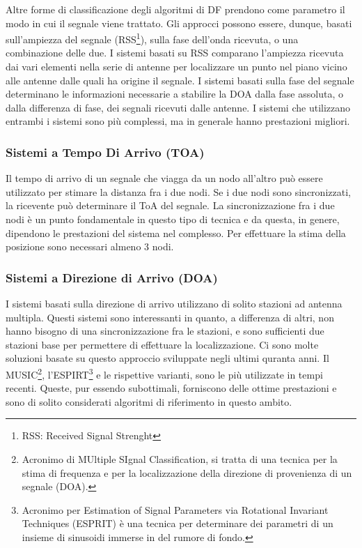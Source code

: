 Altre forme di classificazione degli algoritmi di DF prendono come parametro il modo in cui il segnale viene trattato. Gli approcci possono essere, dunque, basati sull'ampiezza del segnale (RSS\footnote{RSS: Received Signal Strenght}), sulla fase	dell'onda ricevuta, o una combinazione delle due. I sistemi basati su RSS comparano l'ampiezza ricevuta dai vari elementi nella serie di antenne per localizzare un punto nel piano vicino alle antenne dalle quali ha origine il segnale. I sistemi basati sulla fase del segnale determinano le informazioni necessarie a stabilire la DOA dalla fase assoluta, o dalla differenza di fase, dei segnali ricevuti dalle antenne. I sistemi che utilizzano entrambi i sistemi sono più complessi, ma in generale hanno prestazioni migliori.

\subsubsection{Sistemi a Tempo Di Arrivo (TOA)}

Il tempo di arrivo di un segnale che viagga da un nodo all'altro può essere utilizzato per stimare la distanza fra i due nodi. Se i due nodi sono sincronizzati, la ricevente può determinare il ToA del segnale. La sincronizzazione fra i due nodi è un punto fondamentale in questo tipo di tecnica e da questa, in genere, dipendono le prestazioni del sistema nel complesso. Per effettuare la stima della posizione sono necessari almeno 3 nodi.

\subsubsection{Sistemi a Direzione di Arrivo (DOA)}

I sistemi basati sulla direzione di arrivo utilizzano di solito stazioni ad antenna multipla. Questi sistemi sono interessanti in quanto, a differenza di altri, non hanno bisogno di una sincronizzazione fra le stazioni, e sono sufficienti due stazioni base per permettere	di effettuare la localizzazione. Ci sono molte soluzioni basate su questo approccio sviluppate negli ultimi quranta anni. Il MUSIC\footnote{Acronimo di MUltiple SIgnal Classification, si tratta di una tecnica per la stima di frequenza e per la localizzazione della direzione di provenienza di un segnale (DOA).}, l'ESPIRT\footnote{Acronimo per Estimation of Signal Parameters via Rotational Invariant Techniques (ESPRIT) è una tecnica per determinare dei parametri di un insieme di sinusoidi immerse in del rumore di fondo.} e le rispettive varianti, sono le più utilizzate in tempi recenti. Queste, pur essendo subottimali, forniscono delle ottime prestazioni e sono di solito considerati algoritmi di riferimento in questo ambito.

